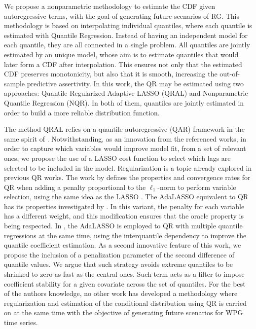 We propose a nonparametric methodology to estimate the CDF given autoregressive terms, with the goal of generating future scenarios of RG. This methodology is based on interpolating individual quantiles, where each quantile is estimated with Quantile Regression.
Instead of having an independent model for each quantile, they are all connected in a single problem. All quantiles are jointly estimated by an unique model, whose aim is to estimate quantiles that would later form a CDF after interpolation. This ensures not only that the estimated CDF preserves monotonicity, but also that it is smooth, increasing the out-of-sample predictive assertivity.
In this work, the QR may be estimated using two approaches: Quantile Regularized Adaptive LASSO (QRAL) and Nonparametric Quantile Regression (NQR). In both of them, quantiles are jointly estimated in order to build a more reliable distribution function. 


The method QRAL relies on a quantile autoregressive (QAR) framework in the same spirit of \cite{koenker1978regression,koenker_quantile_2006,koenker2005quantile}. Notwithstanding, as an innovation from the referenced works, in order to capture which variables would improve model fit, from a set of relevant ones, we propose the use of a LASSO cost function to select which lags are selected to be included in the model.
Regularization is a topic already explored in previous QR works.
The work by \cite{belloni_l1-penalized_2009} defines the properties and convergence rates for QR when adding a penalty proportional to the $\ell_1$-norm to perform variable selection, using the same idea as the LASSO \cite{tibshirani1996regression}. The AdaLASSO equivalent to QR has its properties investigated by \cite{ciuperca_adaptive_2016}. In this variant, the penalty for each variable has a different weight, and this modification ensures that the oracle property is being respected. 
In \cite{zou_regularized_2008,jiang_interquantile_2014}, the AdaLASSO is employed to QR with multiple quantile regressions at the same time, using the interquantile dependency to improve the quantile coefficient estimation.
As a second innovative feature of this work, we propose the inclusion of a penalization parameter of the second difference of quantile values. We argue that such strategy avoids extreme quantiles to be shrinked to zero as fast as the central ones. Such term acts as a filter to impose coefficient stability for a given covariate across the set of quantiles.
For the best of the authors knowledge, no other work has developed a methodology where regularization and estimation of the conditional distribution using QR is carried on at the same time with the objective of generating future scenarios for WPG time series.


